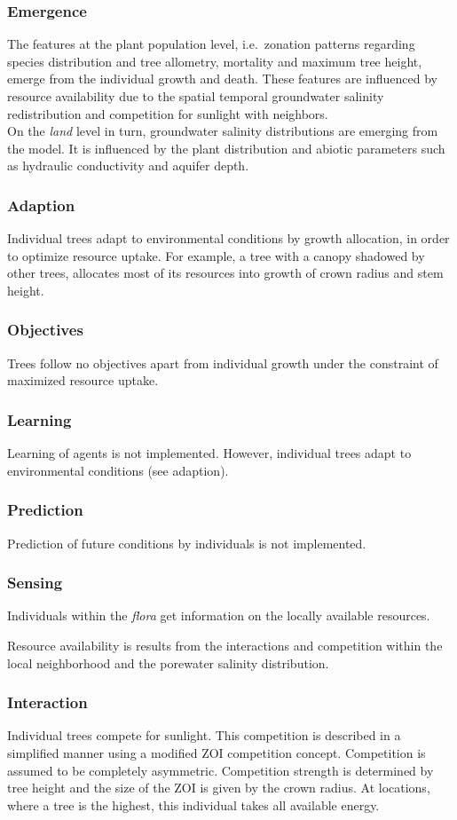 \subsubsection{Emergence}
The features at the plant population level, i.e.~zonation patterns regarding species distribution and tree allometry, mortality and maximum tree height, emerge from the individual growth and death.
These features are influenced by resource availability due to the spatial temporal groundwater salinity redistribution and competition for sunlight with neighbors.\\
On the \textit{land} level in turn, groundwater salinity distributions are emerging from the model.
It is influenced by the plant distribution and abiotic parameters such as hydraulic conductivity and aquifer depth.
\subsubsection{Adaption}
Individual trees adapt to environmental conditions by growth allocation, in order to optimize resource uptake.
For example, a tree with a canopy shadowed by other trees, allocates most of its resources into growth of crown radius and stem height.
\subsubsection{Objectives}
Trees follow no objectives apart from individual growth under the constraint of maximized resource uptake.
\subsubsection{Learning}
Learning of agents is not implemented.
However, individual trees adapt to environmental conditions (see adaption).
\subsubsection{Prediction}
Prediction of future conditions by individuals is not implemented.
\subsubsection{Sensing}
Individuals within the \textit{flora} get information on the locally available resources.

Resource availability is results from the interactions and competition within the local neighborhood and the porewater salinity distribution.
\subsubsection{Interaction}
Individual trees compete for sunlight.
This competition is described in a simplified manner using a modified ZOI competition concept. 
Competition is assumed to be completely asymmetric.
Competition strength is determined by tree height and the size of the ZOI is given by the crown radius.
At locations, where a tree is the highest, this individual takes all available energy.

